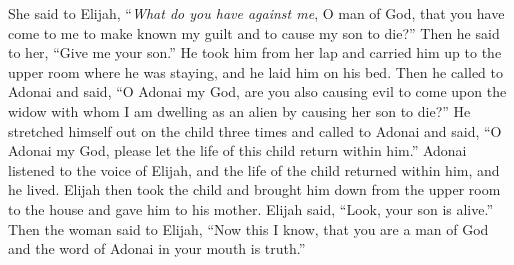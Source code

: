 \begin{biblechapter}
\verse She said to Elijah, “\textit{What do you have against me}, O man of God, that you have come to me to make known my guilt and to cause my son to die?”
\verse Then he said to her, “Give me your son.” He took him from her lap and carried him up to the upper room where he was staying, and he laid him on his bed.
\verse Then he called to Adonai and said, “O Adonai my God, are you also causing evil to come upon the widow with whom I am dwelling as an alien by causing her son to die?”
\verse He stretched himself out on the child three times and called to Adonai and said, “O Adonai my God, please let the life of this child return within him.”
\verse Adonai listened to the voice of Elijah, and the life of the child returned within him, and he lived.
\verse Elijah then took the child and brought him down from the upper room to the house and gave him to his mother. Elijah said, “Look, your son is alive.”
\verse Then the woman said to Elijah, “Now this I know, that you are a man of God and the word of Adonai in your mouth is truth.”
\end{biblechapter}


